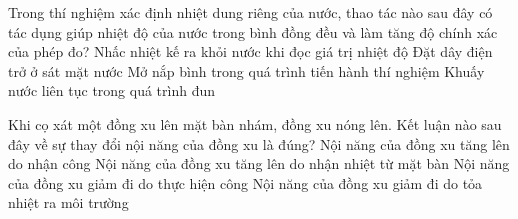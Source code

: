 	\begin{ex}%
		Trong thí nghiệm xác định nhiệt dung riêng của nước, thao tác nào sau đây có tác dụng giúp nhiệt độ của nước trong bình đồng đều và làm tăng độ chính xác của phép đo?
		\choice
		{Nhấc nhiệt kế ra khỏi nước khi đọc giá trị nhiệt độ}
		{Đặt dây điện trở ở sát mặt nước}
		{Mở nắp bình trong quá trình tiến hành thí nghiệm}
		{\True Khuấy nước liên tục trong quá trình đun}
	\end{ex}

	\begin{ex}%
		Khi cọ xát một đồng xu lên mặt bàn nhám, đồng xu nóng lên. Kết luận nào sau đây về sự thay đổi nội năng của đồng xu là đúng?
		\choice
		{\True Nội năng của đồng xu tăng lên do nhận công}
		{Nội năng của đồng xu tăng lên do nhận nhiệt từ mặt bàn}
		{Nội năng của đồng xu giảm đi do thực hiện công}
		{Nội năng của đồng xu giảm đi do tỏa nhiệt ra môi trường}
	\end{ex}


